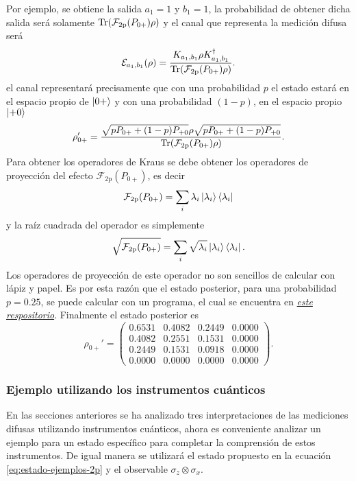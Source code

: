 
Por ejemplo, se obtiene la salida  $a_1=1$ y  $b_{1}=1$, la probabilidad de obtener dicha salida será solamente \({\rm Tr}(\mathcal{F}_{2\text{p}}(P_{0+})\rho)\)
y el canal que representa la medición difusa será \[\mathcal{E}_{a_1 ,b_1} (\rho) = \dfrac{K_{a_1 ,b_1} \rho K^\dagger_{a_1 ,b_1}}{{\rm Tr}(\mathcal{F}_{2\text{p}}(P_{0+})\rho)}. \] el canal representará precisamente que con una probabilidad $p$ el estado estará en el espacio propio de $\ket{0+}$ y con una probabilidad $(1 - p)$, en el espacio propio $\ket{+0}$
\[\rho'_{0+}=\dfrac{\sqrt{p P_{0+}+(1-p)P_{+0}}\rho\sqrt{p P_{0+}+(1-p)P_{+0}}}{{\rm Tr}(\mathcal{F}_{2\text{p}}(P_{0+})\rho)}.\] Para obtener los operadores de Kraus se debe obtener los operadores de proyección del efecto $\mathcal{F}_{2\text{p}}(P_{0+})$, es decir \[\mathcal{F}_{2\text{p}}(P_{0+})= \sum_i \lambda_i \ket{\lambda_i}\bra{\lambda_i}\] y la raíz cuadrada del operador es simplemente \[\sqrt{\mathcal{F}_{2\text{p}}(P_{0+})}=\sum_i \sqrt{\lambda_i} \ket{\lambda_i}\bra{\lambda_i}.\] 
Los operadores de proyección de este operador no son sencillos de calcular con lápiz y papel. Es por esta razón que el estado posterior, para una probabilidad $p=0.25$, se puede calcular con un programa, el cual se encuentra en \href{44}{\textit{este respositorio}}.  Finalmente el estado posterior es \[\rho_{0+}'=\begin{pmatrix}
    0.6531 &  0.4082 &  0.2449 &  0.0000\\
    0.4082 &  0.2551 &  0.1531 &  0.0000\\
    0.2449 &  0.1531 &  0.0918 &  0.0000\\
    0.0000 &  0.0000 &  0.0000 &  0.0000
  \end{pmatrix}.\]





\subsubsection{Ejemplo utilizando los instrumentos cuánticos} %


En las secciones anteriores se ha analizado tres interpretaciones de las mediciones difusas utilizando instrumentos cuánticos, ahora es conveniente analizar un ejemplo para un estado específico para completar la comprensión de estos instrumentos. De igual manera se utilizará el estado propuesto en la ecuación {\eqref{eq:estado-ejemplos-2p}} y el observable $\sigma_z\otimes\sigma_x$.


